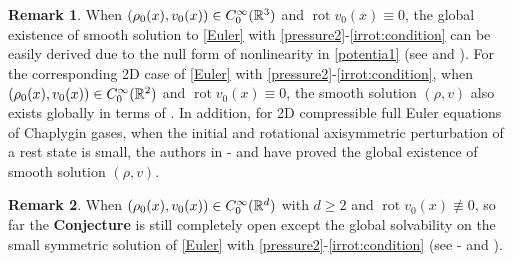 \documentclass[11pt,twoside]{article}
\DeclareMathOperator{\rot}{rot}
\theoremstyle{plain}
\theoremstyle{definition}
\theoremstyle{assumption}
\newtheorem{remark}{Remark}[section]
\numberwithin{equation}{section}
\begin{document}
\begin{remark}\label{Rem-1}	
When $(\rho_0(x), v_0(x))\in C_0^{\infty}(\Bbb R^3)$ and $\rot v_0(x)\equiv 0$,
the global existence of smooth solution to \eqref{Euler} with \eqref{pressure2}-\eqref{irrot:condition}
can be easily derived due to the null form of nonlinearity in \eqref{potentia1} (see \cite{Christodoulou} and \cite{Klainerman2}).
For the corresponding 2D case of \eqref{Euler}
with \eqref{pressure2}-\eqref{irrot:condition}, when $(\rho_0(x), v_0(x))\in C_0^{\infty}(\Bbb R^2)$ and $\rot v_0(x)\equiv 0$,
the smooth solution $(\rho, v)$ also exists globally in terms of \cite{Alinhac1}. In addition, for 2D compressible full Euler equations
of Chaplygin gases, when
the initial and rotational axisymmetric perturbation of a rest state is small, the authors in \cite{HouYin3-0}-\cite{HouYin3-1}
and \cite{Wei}
have proved the global existence of smooth solution $(\rho, v)$.
\end{remark}
	


	
\begin{remark}\label{Rem-3}
When $(\rho_0(x), v_0(x))\in C_0^{\infty}(\Bbb R^d)$ with $d\ge 2$ and $\rot v_0(x)\not\equiv 0$, so far
the {\bf Conjecture} is still completely open
except the global solvability on the  small symmetric solution of  \eqref{Euler} with \eqref{pressure2}-\eqref{irrot:condition} (see
\cite{HouYin3-0}-\cite{HouYin3-1} and \cite{Wei}).
\end{remark}	
\end{document}
